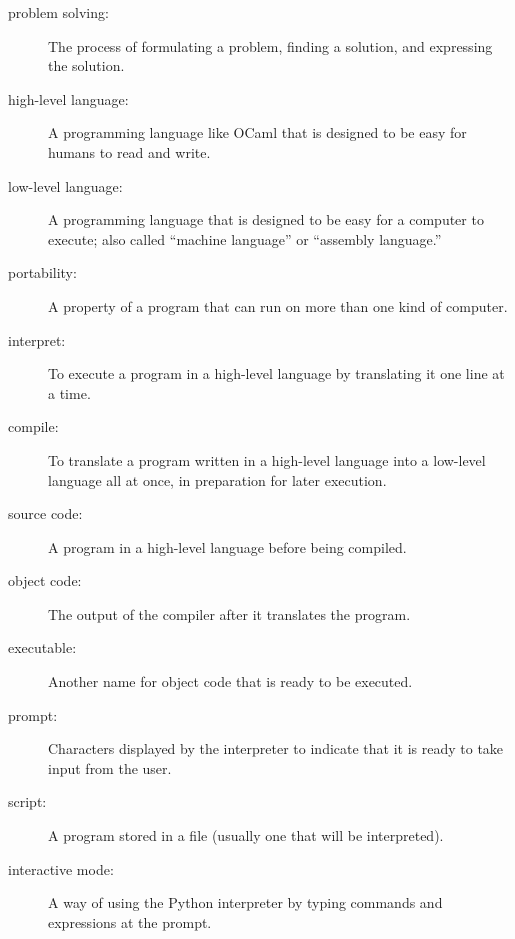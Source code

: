 \documentclass[10pt]{book}
\begin{document}
\begin{description}

\item[problem solving:]  The process of formulating a problem, finding
a solution, and expressing the solution.

\item[high-level language:]  A programming language like OCaml that
is designed to be easy for humans to read and write.

\item[low-level language:]  A programming language that is designed
to be easy for a computer to execute; also called ``machine language'' or
``assembly language.''

\item[portability:]  A property of a program that can run on more
than one kind of computer.

\item[interpret:]  To execute a program in a high-level language
by translating it one line at a time.

\item[compile:]  To translate a program written in a high-level language
into a low-level language all at once, in preparation for later
execution.

\item[source code:]  A program in a high-level language before
being compiled.

\item[object code:]  The output of the compiler after it translates
the program.

\item[executable:]  Another name for object code that is ready
to be executed.

\item[prompt:] Characters displayed by the interpreter to indicate
that it is ready to take input from the user.

\item[script:] A program stored in a file (usually one that will be
interpreted).

\item[interactive mode:] A way of using the Python interpreter by
typing commands and expressions at the prompt.


\end{description}
\end{document}
